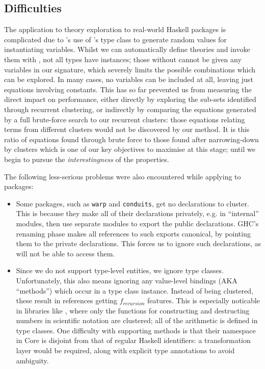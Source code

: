 \subsection{Difficulties}

The application to theory exploration to real-world Haskell packages is
complicated due to \quickspec{}'s use of \quickcheck{}'s  type
class to generate random values for instantiating variables. Whilst we can
automatically define \quickspec{} theories and invoke them with ,
not all types have  instances; those without cannot be given any
variables in our signature, which severely limits the possible combinations
which can be explored. In many cases, no variables can be included at all,
leaving just equations involving constants. This has so far prevented us from
measuring the direct impact on \quickspec{} performance, either directly by
exploring the sub-sets identified through recurrent clustering, or indirectly by
comparing the equations generated by a full brute-force search to our recurrent
clusters: those equations relating terms from different clusters would not be
discovered by our method. It is this ratio of equations found through brute
force to those found after narrowing-down by clusters which is one of our key
objectives to maximise at this stage; until we begin to pursue the
\emph{interestingness} of the properties.

The following less-serious problems were also encountered while applying
\mlforhs{} to \hackage{} packages:

\begin{itemize}
\item Some packages, such as \texttt{warp} and \texttt{conduits}, get no
  declarations to cluster. This is because they make all of their declarations
  privately, e.g. in ``internal'' modules, then use separate modules to export
  the public declarations. GHC's renaming phase makes all references to such
  exports canonical, by pointing them to the private declarations. This forces
  us to ignore such declarations, as \quickspec{} will not be able to access them.

\item Since we do not support type-level entities, we ignore type
  classes. Unfortunately, this also means ignoring any value-level bindings (AKA
  ``methods'') which occur in a type class instance. Instead of being clustered,
  these result in references getting $f_{recursion}$ features. This is
  especially noticable in libraries like , where only the
  functions for constructing and destructing numbers in scientific notation are
  clustered; all of the arithmetic is defined in type classes. One difficulty
  with supporting methods is that their namespace in Core is disjoint from that
  of regular Haskell identifiers: a transformation layer would be required,
  along with explicit type annotations to avoid ambiguity.
\end{itemize}
